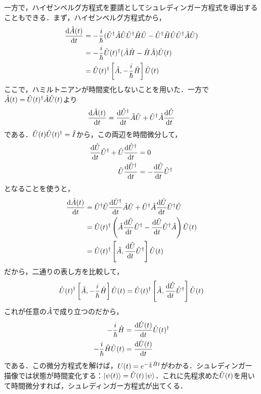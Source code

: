 \documentclass[a4paper,10pt,uplatex]{jsarticle}
\begin{document}
一方で，ハイゼンベルグ方程式を要請としてシュレディンガー方程式を導出することもできる．まず，ハイゼンベルグ方程式から，
\begin{align}
   \dv{\hat{A}(t)}{t} &= -\frac{i}{\hbar}(\hat{U}^\dagger\hat{A}\hat{U}\hat{U}^\dagger\hat{H}\hat{U} - \hat{U}^\dagger\hat{H}\hat{U}\hat{U}^\dagger\hat{A}\hat{U}) \\
   &= -\frac{i}{\hbar}\hat{U}(t)^\dagger(\hat{A}\hat{H}-\hat{H}\hat{A})\hat{U}(t) \\
   &= \hat{U}(t)^\dagger \left[\hat{A}, -\frac{i}{\hbar}\hat{H}\right] \hat{U}(t)
\end{align}
ここで，ハミルトニアンが時間変化しないことを用いた．一方で$\hat{A}(t) = \hat{U}(t)^\dagger \hat{A} \hat{U}(t)$より
\begin{equation}
    \dv{\hat{A}(t)}{t} = \dv{\hat{U}^\dagger}{t}\hat{A}\hat{U} + \hat{U}^\dagger\hat{A}\dv{\hat{U}}{t}
\end{equation}
である．$\hat{U}(t)\hat{U}(t)^\dagger = \hat{I}$から，この両辺を時間微分して，
\begin{align}
    \dv{\hat{U}}{t}\hat{U}^\dagger + \hat{U}\dv{\hat{U}^\dagger}{t} &= 0 \\
    \hat{U}\dv{\hat{U}^\dagger}{t} &= -\dv{\hat{U}}{t}\hat{U}^\dagger
\end{align}
となることを使うと，
\begin{align}
    \dv{\hat{A}(t)}{t} &= \hat{U}^\dagger\hat{U}\dv{\hat{U}^\dagger}{t}\hat{A}\hat{U} + \hat{U}^\dagger\hat{A}\dv{\hat{U}}{t}\hat{U}^\dagger\hat{U} \\
    &= \hat{U}(t)^\dagger\left(\hat{A}\dv{\hat{U}}{t}\hat{U}^\dagger - \dv{\hat{U}}{t}\hat{U}^\dagger\hat{A}\right)\hat{U}(t) \\
    &= \hat{U}(t)^\dagger\left[\hat{A},\dv{\hat{U}}{t}\hat{U}^\dagger\right] \hat{U}(t)
\end{align}
だから，二通りの表し方を比較して，
\begin{equation}
    \hat{U}(t)^\dagger \left[\hat{A}, -\frac{i}{\hbar}\hat{H}\right] \hat{U}(t) = \hat{U}(t)^\dagger\left[\hat{A},\dv{\hat{U}}{t}\hat{U}^\dagger\right] \hat{U}(t)
\end{equation}
これが任意の$\hat{A}$で成り立つのだから，
\begin{align}
    -\frac{i}{\hbar}\hat{H} &= \dv{\hat{U}(t)}{t}\hat{U}(t)^\dagger \\
    -\frac{i}{\hbar}\hat{H}\hat{U}(t) &= \dv{\hat{U}(t)}{t}
\end{align}
である．この微分方程式を解けば，$U(t) = e^{-\frac{i}{\hbar}\hat{H} t}$がわかる．シュレディンガー描像では状態が時間変化する：$\ket{\psi(t)} = \hat{U}(t)\ket{\psi}$．これに先程求めた$\hat{U}(t)$を用いて時間微分すれば，シュレディンガー方程式が出てくる．

\begin{comment}
    要請：時間発展演算子がユニタリー，ハミルトニアンは不変，ハイゼンベルグ方程式
\end{comment}
\end{document}
